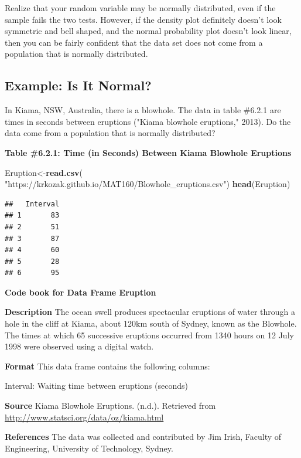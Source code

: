 \documentclass[
]{book}
\newenvironment{Shaded}{\begin{snugshade}}{\end{snugshade}}
\newcommand{\KeywordTok}[1]{\textcolor[rgb]{0.13,0.29,0.53}{\textbf{#1}}}
\newcommand{\NormalTok}[1]{#1}
\newcommand{\StringTok}[1]{\textcolor[rgb]{0.31,0.60,0.02}{#1}}
\begin{document}
Realize that your random variable may be normally distributed, even if the sample fails the two tests. However, if the density plot definitely doesn't look symmetric and bell shaped, and the normal probability plot doesn't look linear, then you can be fairly confident that the data set does not come from a population that is normally distributed.

\hypertarget{example-is-it-normal}{%
\subsection{Example: Is It Normal?}\label{example-is-it-normal}}

In Kiama, NSW, Australia, there is a blowhole. The data in table \#6.2.1 are times in seconds between eruptions ("Kiama blowhole eruptions," 2013). Do the data come from a population that is normally distributed?

\textbf{Table \#6.2.1: Time (in Seconds) Between Kiama Blowhole Eruptions }

\begin{Shaded}
\begin{Highlighting}[]
\NormalTok{Eruption<-}\KeywordTok{read.csv}\NormalTok{(}
  \StringTok{"https://krkozak.github.io/MAT160/Blowhole_eruptions.csv"}\NormalTok{)}
\KeywordTok{head}\NormalTok{(Eruption)}
\end{Highlighting}
\end{Shaded}

\begin{verbatim}
##   Interval
## 1       83
## 2       51
## 3       87
## 4       60
## 5       28
## 6       95
\end{verbatim}

\textbf{Code book for Data Frame Eruption}

\textbf{Description}
The ocean swell produces spectacular eruptions of water through a hole in the cliff at Kiama, about 120km south of Sydney, known as the Blowhole. The times at which 65 successive eruptions occurred from 1340 hours on 12 July 1998 were observed using a digital watch.

\textbf{Format}
This data frame contains the following columns:

Interval: Waiting time between eruptions (seconds)

\textbf{Source}
Kiama Blowhole Eruptions. (n.d.). Retrieved from \url{http://www.statsci.org/data/oz/kiama.html}

\textbf{References}
The data was collected and contributed by Jim Irish, Faculty of Engineering, University of Technology, Sydney.
\end{document}
